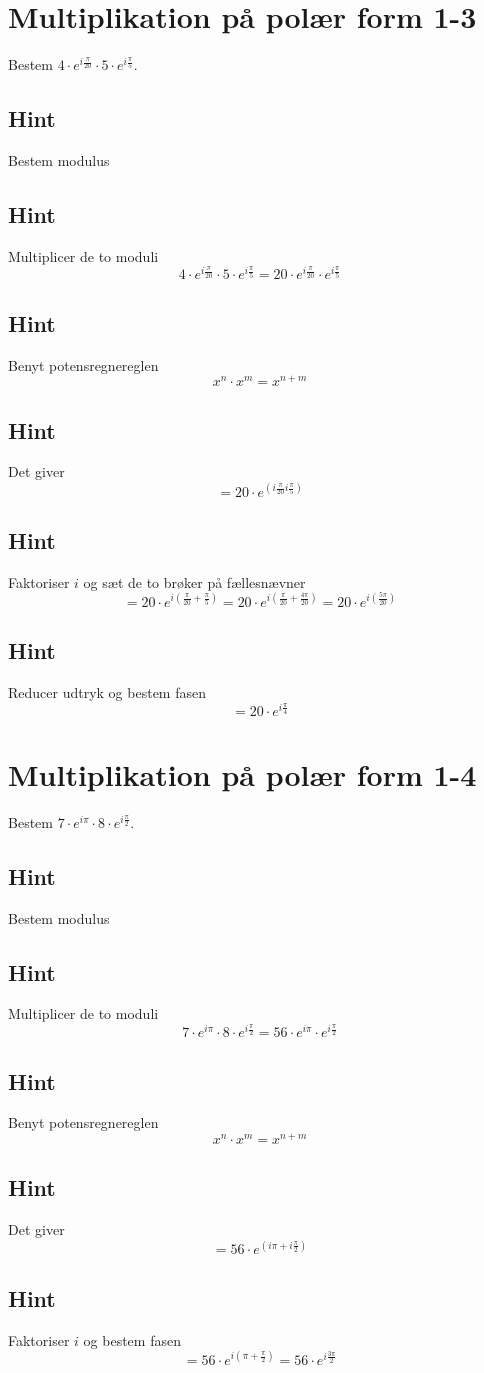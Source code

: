 \documentclass{article}
\newenvironment{exercise}[1]{\newpage\section{#1}}{}
\newcommand{\answerbox}[1]{\fbox{$#1$}}
\newcommand{\hint}{\subsection*{Hint}}
\begin{document}
\newpage

\begin{exercise}{Multiplikation på polær form 1-3}
	
	Bestem $4 \cdot e^{i \frac{\pi}{20}} \cdot 5 \cdot e^{i \frac{\pi}{5}}$.
	
	\answerbox{20 \cdot e^{i \frac{\pi}{4}}}
	
	
	\hint 
	
	Bestem modulus
	
	
	\hint
	
	Multiplicer de to moduli 
	\[
	4 \cdot e^{i \frac{\pi}{20}} \cdot 5 \cdot e^{i \frac{\pi}{5}} = 20 \cdot e^{i \frac{\pi}{20}} \cdot e^{i \frac{\pi}{5}}
	\]
	
	\hint 
	
	Benyt potensregnereglen
	\[
	x^n \cdot x^m = x^{n+m}
	\]
	
	\hint
	
	Det giver
	\[
	=20 \cdot e^{(i \frac{\pi}{20}i \frac{\pi}{5})}
	\]
	
	\hint
	
	Faktoriser $i$ og sæt de to brøker på fællesnævner
	\[
	= 20 \cdot e^{i( \frac{\pi}{20} + \frac{\pi}{5})} = 20 \cdot e^{i( \frac{\pi}{20} + \frac{4 \pi}{20})} = 20 \cdot e^{i( \frac{5\pi}{20})}  
	\]
	
	\hint
	
	Reducer udtryk og bestem fasen
	\[
	= 20 \cdot e^{i \frac{\pi}{4}}
	\]
	
\end{exercise}


\newpage

\begin{exercise}{Multiplikation på polær form 1-4}
	
	Bestem $7 \cdot e^{i \pi} \cdot 8 \cdot e^{i \frac{\pi}{2}}$.
	
	\answerbox{56 \cdot e^{i \frac{3\pi}{2}}}
	
	
	\hint 
	
	Bestem modulus
	
	
	\hint
	
	Multiplicer de to moduli 
	\[
	7 \cdot e^{i \pi} \cdot 8 \cdot e^{i \frac{\pi}{2}} = 56 \cdot e^{i \pi} \cdot e^{i \frac{\pi}{2}}
	\]
	
	\hint 
	
	Benyt potensregnereglen
	\[
	x^n \cdot x^m = x^{n+m}
	\]
	
	\hint
	
	Det giver
	\[
	= 56 \cdot e^{(i \pi +i \frac{\pi}{2})}
	\]
	
	\hint
	
	Faktoriser $i$ og bestem fasen
	\[
	= 56 \cdot e^{i( \pi +\frac{\pi}{2})} = 56 \cdot e^{i \frac{3\pi}{2}}
	\]
	
	
\end{exercise}
\end{document}
